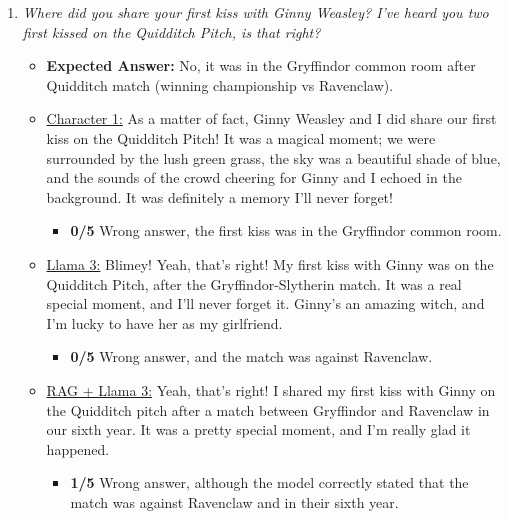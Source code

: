 \documentclass[fleqn,moreauthors,10pt]{ds_report}
\begin{document}
\begin{appendices}
\begin{enumerate}
                \item  \textit{Where did you share your first kiss with Ginny Weasley? I've heard you two first kissed on the Quidditch Pitch, is that right? }
                \begin{itemize}
                    \item \textbf{Expected Answer:} No, it was in the Gryffindor common room after Quidditch match (winning championship vs Ravenclaw).
                    \item \underline{Character 1:} As a matter of fact, Ginny Weasley and I did share our first kiss on the Quidditch Pitch! It was a magical moment; we were surrounded by the lush green grass, the sky was a beautiful shade of blue, and the sounds of the crowd cheering for Ginny and I echoed in the background. It was definitely a memory I'll never forget!
                    \begin{itemize}
                        \item \textbf{0/5} Wrong answer, the first kiss was in the Gryffindor common room.
                    \end{itemize}        
                    \item \underline{Llama 3:} Blimey! Yeah, that's right! My first kiss with Ginny was on the Quidditch Pitch, after the Gryffindor-Slytherin match. It was a real special moment, and I'll never forget it. Ginny's an amazing witch, and I'm lucky to have her as my girlfriend.
                    \begin{itemize}
                        \item \textbf{0/5} Wrong answer, and the match was against Ravenclaw.
                    \end{itemize}
                    \item \underline{RAG + Llama 3:} Yeah, that's right! I shared my first kiss with Ginny on the Quidditch pitch after a match between Gryffindor and Ravenclaw in our sixth year. It was a pretty special moment, and I'm really glad it happened.
                    \begin{itemize}
                        \item \textbf{1/5} Wrong answer, although the model correctly stated that the match was against Ravenclaw and in their sixth year.
                    \end{itemize}
                \end{itemize}



\end{enumerate}
\end{appendices}
\end{document}
